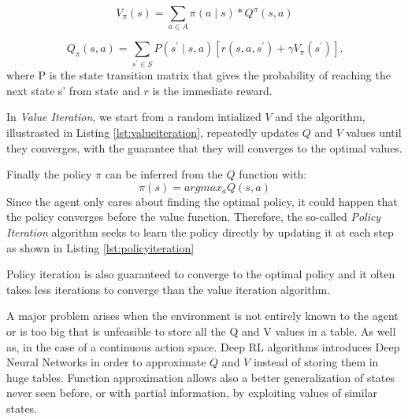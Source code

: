 \begin{equation}
  \label{eq:statevaluefromQ}
  V_{\pi}(s) = \sum_{a\in A} \pi(a \mid s) * Q^{\pi} (s,a)
\end{equation}

\begin{equation}
  \label{eq:actionstatevaluefromV}
  Q_{\pi}(s,a) = \sum_{s^{'}\in S} P(s^{'} \mid s,a) [r(s,a,s^{'}) + \gamma V_{\pi} (s^{'})].
\end{equation}
where P is the state transition matrix that gives the probability of reaching the next state s’ from state and $r$ is the immediate reward.

In \textit{Value Iteration}, we start from a random intialized $V$ and the algorithm, illustrasted in Listing \ref{lst:valueiteration}, repeatedly updates $Q$ and $V$ values until they converges, with the guarantee that they will converges to the optimal values.  

\begin{center}
  \begin{minipage}{0.65\linewidth}
    
    \end{minipage}
\end{center}
Finally the policy $\pi$ can be inferred from the $Q$ function with:
\begin{equation}
  \label{eq:pifromq}
  \pi(s) = argmax_a Q(s,a)
\end{equation}
Since the agent only cares about finding the optimal policy, it could happen that the policy converges before the value function. Therefore, the so-called \textit{Policy Iteration} algorithm seeks to learn the policy directly by updating it at each step as shown in Listing \ref{lst:policyiteration}
\begin{center}
  \begin{minipage}{0.65\linewidth}
    
    \end{minipage}
\end{center}
Policy iteration is also guaranteed to converge to the optimal policy and it often takes less iterations to converge than the value iteration algorithm.

A major problem arises when the environment is not entirely known to the agent or is too big that is unfeasible to store all the Q and V values in a table. As well as, in the case of a continuous action space. Deep RL algorithms introduces Deep Neural Networks in order to approximate $Q$ and $V$ instead of storing them in huge tables. Function approximation allows also a better generalization of states never seen before, or with partial information, by exploiting values of similar states. 


